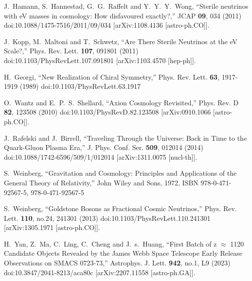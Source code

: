 \documentclass[universe,article,submit,moreauthors,pdftex,a4paper]{Definitions/mdpi}
\begin{document}
\begin{thebibliography}{99}
J.~Hamann, S.~Hannestad, G.~G.~Raffelt and Y.~Y.~Y.~Wong,
``Sterile neutrinos with eV masses in cosmology: How disfavoured exactly?,''
JCAP \textbf{09}, 034 (2011)
doi:10.1088/1475-7516/2011/09/034
[arXiv:1108.4136 [astro-ph.CO]].

J.~Kopp, M.~Maltoni and T.~Schwetz,
``Are There Sterile Neutrinos at the eV Scale?,''
Phys. Rev. Lett. \textbf{107}, 091801 (2011)
doi:10.1103/PhysRevLett.107.091801
[arXiv:1103.4570 [hep-ph]].

H.~Georgi,
``New Realization of Chiral Symmetry,''
Phys. Rev. Lett. \textbf{63}, 1917-1919 (1989)
doi:10.1103/PhysRevLett.63.1917

O.~Wantz and E.~P.~S.~Shellard,
``Axion Cosmology Revisited,''
Phys. Rev. D \textbf{82}, 123508 (2010)
doi:10.1103/PhysRevD.82.123508
[arXiv:0910.1066 [astro-ph.CO]].

J.~Rafelski and J.~Birrell,
``Traveling Through the Universe: Back in Time to the Quark-Gluon Plasma Era,''
J. Phys. Conf. Ser. \textbf{509}, 012014 (2014)
doi:10.1088/1742-6596/509/1/012014
[arXiv:1311.0075 [nucl-th]].

S.~Weinberg,
``Gravitation and Cosmology: Principles and Applications of the General Theory of Relativity,''
John Wiley and Sons, 1972,
ISBN 978-0-471-92567-5, 978-0-471-92567-5

S.~Weinberg,
``Goldstone Bosons as Fractional Cosmic Neutrinos,''
Phys. Rev. Lett. \textbf{110}, no.24, 241301 (2013)
doi:10.1103/PhysRevLett.110.241301
[arXiv:1305.1971 [astro-ph.CO]].

H.~Yan, Z.~Ma, C.~Ling, C.~Cheng and J.~s.~Huang,
``First Batch of z \ensuremath{\approx} 11\textendash{}20 Candidate Objects Revealed by the James Webb Space Telescope Early Release Observations on SMACS 0723-73,''
Astrophys. J. Lett. \textbf{942}, no.1, L9 (2023)
doi:10.3847/2041-8213/aca80c
[arXiv:2207.11558 [astro-ph.GA]].


\end{thebibliography}
\end{document}

